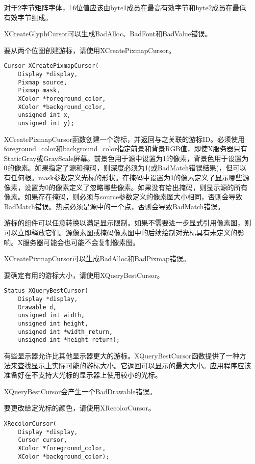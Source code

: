 对于2字节矩阵字体，16位值应该由byte1成员在最高有效字节和byte2成员在最低有效字节组成。

XCreateGlyphCursor可以生成BadAlloc、BadFont和BadValue错误。

要从两个位图创建游标，请使用XCreatePixmapCursor。

\begin{lstlisting}
Cursor XCreatePixmapCursor(
	Display *display,
	Pixmap source,
	Pixmap mask,
	XColor *foreground_color,
	XColor *background_color,
	unsigned int x,
	unsigned int y);
\end{lstlisting}

XCreatePixmapCursor函数创建一个游标，并返回与之关联的游标ID。必须使用foreground\_color和background\_color指定前景和背景RGB值，即使X服务器只有StaticGray或GrayScale屏幕。前景色用于源中设置为1的像素，背景色用于设置为0的像素。如果指定了源和掩码，则深度必须为1(或BadMatch错误结果)，但可以有任何根。mask参数定义光标的形状。在掩码中设置为1的像素定义了显示哪些源像素，设置为0的像素定义了忽略哪些像素。如果没有给出掩码，则显示源的所有像素。如果存在掩码，则必须与source参数定义的像素图大小相同，否则会导致BadMatch错误。热点必须是源中的一个点，否则会导致BadMatch错误。

游标的组件可以任意转换以满足显示限制。如果不需要进一步显式引用像素图，则可以立即释放它们。源像素图或掩码像素图中的后续绘制对光标具有未定义的影响。X服务器可能会也可能不会复制像素图。

XCreatePixmapCursor可以生成BadAlloc和BadPixmap错误。

要确定有用的游标大小，请使用XQueryBestCursor。

\begin{lstlisting}
Status XQueryBestCursor(
	Display *display,
	Drawable d,
	unsigned int width,
	unsigned int height,
	unsigned int *width_return,
	unsigned int *height_return);
\end{lstlisting}

有些显示器允许比其他显示器更大的游标。XQueryBestCursor函数提供了一种方法来查找显示上实际可能的游标大小。它返回可以显示的最大大小。应用程序应该准备好在不支持大光标的显示器上使用较小的光标。

XQueryBestCursor会产生一个BadDrawable错误。

要更改给定光标的颜色，请使用XRecolorCursor。

\begin{lstlisting}
XRecolorCursor(
	Display *display,
	Cursor cursor,
	XColor *foreground_color,
	XColor *background_color);
\end{lstlisting}


